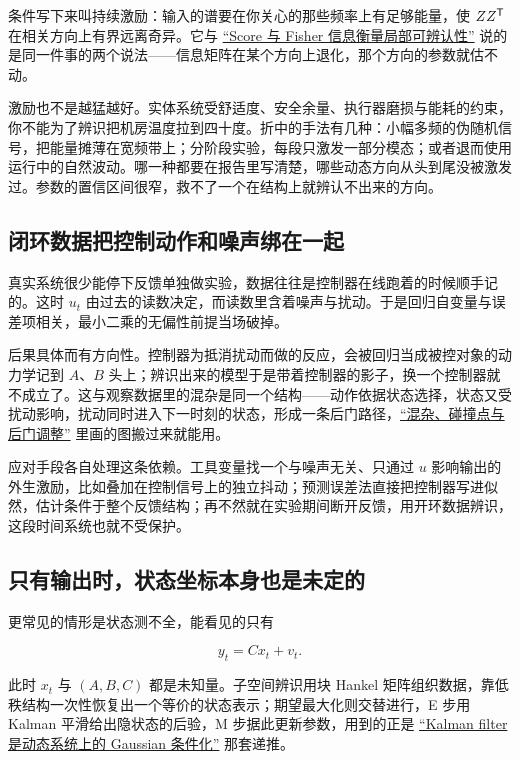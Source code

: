 条件写下来叫持续激励：输入的谱要在你关心的那些频率上有足够能量，使 \(ZZ^{\mathsf{T}}\) 在相关方向上有界远离奇异。它与 \hyperref[sec:11-Mathematical-Statistics/03-Sufficient-Statistics-and-Information/02]{``Score 与 Fisher 信息衡量局部可辨认性''} 说的是同一件事的两个说法——信息矩阵在某个方向上退化，那个方向的参数就估不动。

激励也不是越猛越好。实体系统受舒适度、安全余量、执行器磨损与能耗的约束，你不能为了辨识把机房温度拉到四十度。折中的手法有几种：小幅多频的伪随机信号，把能量摊薄在宽频带上；分阶段实验，每段只激发一部分模态；或者退而使用运行中的自然波动。哪一种都要在报告里写清楚，哪些动态方向从头到尾没被激发过。参数的置信区间很窄，救不了一个在结构上就辨认不出来的方向。

\subsection{闭环数据把控制动作和噪声绑在一起}

真实系统很少能停下反馈单独做实验，数据往往是控制器在线跑着的时候顺手记的。这时 \(u_t\) 由过去的读数决定，而读数里含着噪声与扰动。于是回归自变量与误差项相关，最小二乘的无偏性前提当场破掉。

后果具体而有方向性。控制器为抵消扰动而做的反应，会被回归当成被控对象的动力学记到 \(A\)、\(B\) 头上；辨识出来的模型于是带着控制器的影子，换一个控制器就不成立了。这与观察数据里的混杂是同一个结构——动作依据状态选择，状态又受扰动影响，扰动同时进入下一时刻的状态，形成一条后门路径，\hyperref[sec:13-Machine-Learning/12-Causal-Inference/03]{``混杂、碰撞点与后门调整''} 里画的图搬过来就能用。

应对手段各自处理这条依赖。工具变量找一个与噪声无关、只通过 \(u\) 影响输出的外生激励，比如叠加在控制信号上的独立抖动；预测误差法直接把控制器写进似然，估计条件于整个反馈结构；再不然就在实验期间断开反馈，用开环数据辨识，这段时间系统也就不受保护。

\subsection{只有输出时，状态坐标本身也是未定的}

更常见的情形是状态测不全，能看见的只有

\[
y_t = C x_t + v_t .
\]

此时 \(x_t\) 与 \((A,B,C)\) 都是未知量。子空间辨识用块 Hankel 矩阵组织数据，靠低秩结构一次性恢复出一个等价的状态表示；期望最大化则交替进行，E 步用 Kalman 平滑给出隐状态的后验，M 步据此更新参数，用到的正是 \hyperref[sec:13-Machine-Learning/07-Graphical-and-Sequential-Models/03]{``Kalman filter 是动态系统上的 Gaussian 条件化''} 那套递推。


